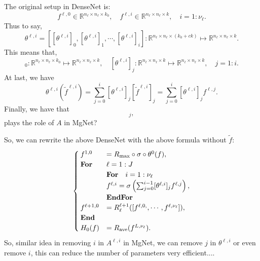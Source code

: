 The original setup in DenseNet is:
\begin{equation}
f^{\ell,0} \in \mathbb{R}^{n_\ell \times n_\ell \times k_0}, \quad f^{\ell,i} \in \mathbb{R}^{n_\ell \times n_\ell \times k}, \quad i = 1:\nu_\ell.
\end{equation}
Thus to say,
\begin{equation}
\theta^{\ell,i} = [[\theta^{\ell,i}]_0, [\theta^{\ell,i}]_{1}, \cdots, [\theta^{\ell,i}]_i]: \mathbb{R}^{n_\ell\times n_\ell \times (k_0 + ck)} \mapsto \mathbb{R}^{n_\ell\times n_\ell \times k} .
\end{equation}
This means that,
\begin{equation}
[\theta^{\ell,i}]_{0}:  \mathbb{R}^{n_\ell\times n_\ell \times k_0 } \mapsto \mathbb{R}^{n_\ell\times n_\ell \times k}, \quad [\theta^{\ell,i}]_{j}:  \mathbb{R}^{n_\ell\times n_\ell \times k } \mapsto \mathbb{R}^{n_\ell\times n_\ell \times k}, \quad j = 1:i.
\end{equation}
At last, we have 
\begin{equation}
\theta^{\ell,i}(\tilde f^{\ell,i}) = \sum_{j=0}^i [\theta^{\ell,i}]_{j} [\tilde f^{\ell,i}]_j = \sum_{j=0}^i [\theta^{\ell,i}]_{j} f^{\ell,j}.
\end{equation}
Finally, we have that 
\begin{equation}
[\theta^{\ell,i}]_{j},
\end{equation}
plays the role of $A$ in MgNet?

So, we can rewrite the above DenseNet with the above formula without $\tilde f$:
\begin{equation}\label{eq:densenet1}
\begin{cases}
f^{1,0} &=R_{\rm max}\circ \sigma \circ \theta^0(f), \\
\text{\bf For} &\ell = 1:J \\
\quad &\text{\bf For} \quad i = 1:\nu_\ell \\
&f^{\ell,i} = \sigma \left( \sum_{j=0}^{i-1} [\theta^{\ell,i}]_{j} f^{\ell,j} \right) ,\\
\quad &\text{\bf EndFor} \\
f^{\ell+1,0} &=  R_\ell^{\ell+1} ([f^{\ell,0,}, \cdots, f^{\ell,\nu_\ell}] ) , \\
\text{\bf End} &\\
H_0(f) &=  R_{\rm ave}(f^{L,\nu_\ell}). \\
\end{cases}
\end{equation}
So, similar idea in removing $i$ in $A^{\ell,i}$ in MgNet, we can remove $j$ in $\theta^{\ell,i}$ or
even remove $i$, this can reduce the number of parameters very efficient....

